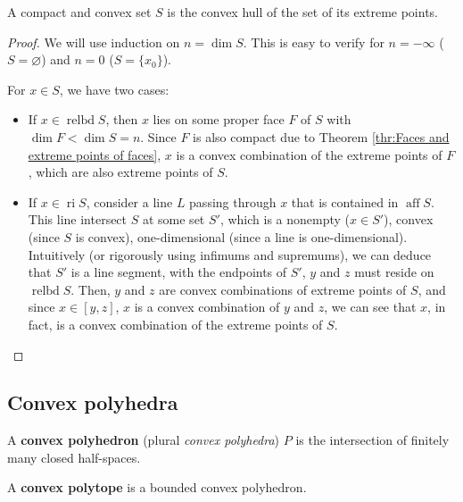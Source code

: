 \begin{theorem}
\label{thr:Krein-Milman Theorem}
  A compact and convex set \( S \) is the convex hull of the set of its extreme
  points.
\end{theorem}

\begin{proof}
  We will use induction on \( n = \dim S \). This is easy to
  verify for \( n = -\infty \) (\( S = \varnothing \)) and \( n = 0 \) (\( S =
  \{x_{0}\}   \)).

  For \( x \in S \), we have two cases:

  \begin{itemize}
  \item If \( x \in \operatorname{relbd} S \), then \( x \) lies on some proper
    face \( F \) of \( S \) with \( \dim F < \operatorname{dim} S
    = n\). Since \( F \) is also compact due to Theorem \ref{thr:Faces and
    extreme points of faces}, \( x \) is a convex combination of the
    extreme points of \( F \), which are also extreme points of \( S \).

  \item If \( x \in \operatorname{ri} S \), consider a line \( L \) passing
    through \( x \) that is contained in \( \operatorname{aff} S \). This line
    intersect \( S \) at some set \( S' \), which is a nonempty (\( x \in S'
    \)), convex (since \( S \) is convex), one-dimensional (since a line is
    one-dimensional). Intuitively (or rigorously using infimums and supremums),
    we can deduce that \( S' \) is a line segment, with the endpoints of \( S'
    \), \( y \) and \( z \) must reside on \( \operatorname{relbd} S \). Then,
    \( y \) and \( z \) are convex combinations of extreme points of \( S \),
    and since \( x \in [y, z] \), \( x \) is a convex combination of \( y \) and
    \( z \), we can see that \( x \), in fact, is a convex combination of the
    extreme points of \( S \).
  \end{itemize}
\end{proof}



\subsection{Convex polyhedra} %
\label{sub:Convex polyhedra}

\begin{definition}
  A \textbf{convex polyhedron} (plural \textit{convex polyhedra}) \( P \) is
  the intersection of finitely many closed half-spaces.

  A \textbf{convex polytope} is a bounded convex polyhedron.
\end{definition}

